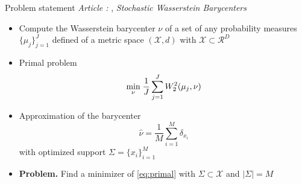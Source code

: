 \begin{frame}{Problem statement}
    \textit{Article :} \cite{claici_stochastic_2018}, \textit{Stochastic Wasserstein Barycenters}
    \begin{itemize}
        \item Compute the Wasserstein barycenter $\nu$ of a set of any probability measures $\lbrace \mu_j \rbrace_{j=1}^J$  defined of a metric space $(\mathcal{X}, d)$ with $\mathcal{X} \subset \mathcal{R}^D$
        \item Primal problem 
        \begin{equation}\label{eq:primal}
        \underset{\nu}{\min}\; \frac{1}{J}\sum_{j=1}^{J} W_2^2(\mu_j, \nu)
        \end{equation}
        \pause
        \item Approximation of the barycenter 
        $$ \hat{\nu} = \frac{1}{M} \sum_{i=1}^{M} \delta_{x_i} $$
        with optimized support $\Sigma = \lbrace x_i \rbrace_{i=1}^M$ 
        \item \textbf{Problem.} Find a minimizer of \eqref{eq:primal} with $\Sigma\subset \mathcal{X}$ and $|\Sigma| = M$
    \end{itemize}
\end{frame}

